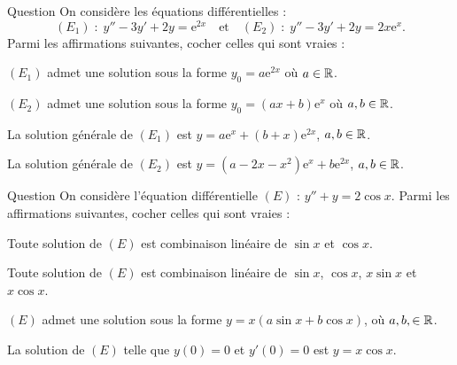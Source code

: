 \begin{multi}[multiple,feedback=
{Les racines de l'équation caractéristique sont \(1\) et \(2\). Donc \((E_1)\) admet une solution particulière sous la forme \(\displaystyle y_0=ax\mathrm{e}^{2x}\), car \(2\) est une racine simple de l'équation caractéristique, et \((E_2)\) admet une solution particulière sous la forme \(\displaystyle y_0=x(a+bx)\mathrm{e}^{x}\) car \(1\) est une racine simple de l'équation caractéristique.
}]{Question}
On considère les équations différentielles :
\[(E_1)\; :\; y''-3y'+2y=\mathrm{e}^{2x}\quad \mbox{et}\quad (E_2)\; :\; y''-3y'+2y=2x\mathrm{e}^{x}.\]
Parmi les affirmations suivantes, cocher celles qui sont vraies :

    \item \((E_1)\) admet une solution sous la forme \(\displaystyle y_0=a\mathrm{e}^{2x}\) où \(a\in \mathbb{R}\).
    \item \((E_2)\) admet une solution sous la forme \(\displaystyle y_0=(ax+b)\mathrm{e}^{x}\) où \(a,b\in \mathbb{R}\).
    \item* La solution générale de \((E_1)\) est \(\displaystyle y=a\mathrm{e}^{x}+(b+x)\mathrm{e}^{2x}\), \(a,b\in \mathbb{R}\).
    \item* La solution générale de \((E_2)\) est \(\displaystyle y=\left(a-2x-x^2\right)\mathrm{e}^{x}+b\mathrm{e}^{2x}\), \(a,b\in \mathbb{R}\).
\end{multi}


\begin{multi}[multiple,feedback=
{La solution générale  de l'équation homogène est : \(Y=k_1\cos x+k_2\sin x\), \(k_1,k_2\in \Rr\). On vérifie que, \(\displaystyle y_0=x\sin x \) est une solution particulière de \((E)\). Donc la solution générale de \((E)\) est : \(\displaystyle y=k_1\cos x+(k_2+x)\sin x\), pour \(k_1,k_2\in \Rr\). Enfin, \(y(0)=0\Rightarrow k_1=0\) et \(y'(0)=0\Rightarrow k_2=0\).
}]{Question}
On considère l'équation différentielle \((E)\) : \(y''+y=2\cos x\). Parmi les affirmations suivantes, cocher celles qui sont vraies :

    \item Toute solution de \((E)\) est combinaison linéaire de \(\sin x\) et \(\cos x\).
    \item* Toute solution de \((E)\) est combinaison linéaire de \(\sin x\), \(\cos x\), \(x\sin x\) et \(x\cos x\).
    \item* \((E)\) admet une solution sous la forme \(y=x(a\sin x+b\cos x)\), où \(a,b,\in \mathbb{R}\).
    \item La solution de \((E)\) telle que \(y(0)=0\) et \(y'(0)=0\) est \(\displaystyle y=x\cos x\).
\end{multi}


